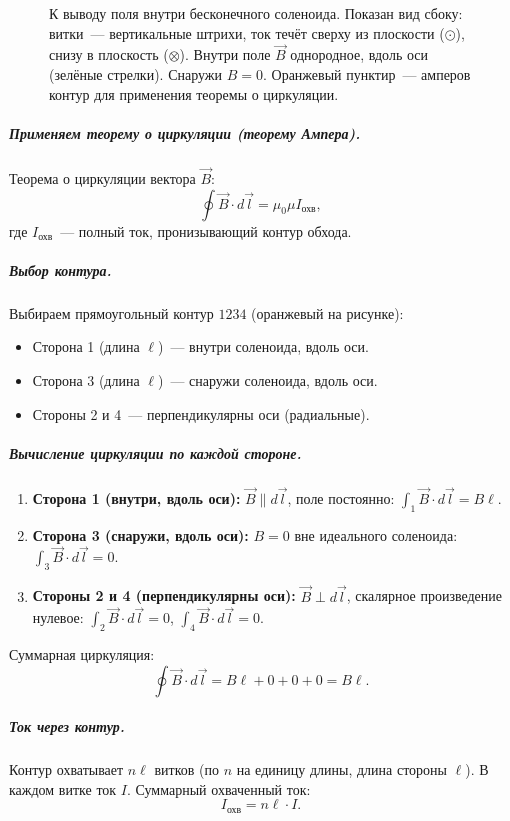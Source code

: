 \documentclass[12pt]{article}
\begin{document}
\begin{figure}[H]
\caption{К выводу поля внутри бесконечного соленоида. Показан вид сбоку:
витки~--- вертикальные штрихи, ток течёт сверху из плоскости
($\odot$), снизу в плоскость ($\otimes$). Внутри поле $\vec{B}$
однородное, вдоль оси (зелёные стрелки). Снаружи $B = 0$. Оранжевый
пунктир~--- амперов контур для применения теоремы о циркуляции.}
\label{fig:solenoid-field}
\end{figure}

\subparagraph{Применяем теорему о циркуляции (теорему Ампера).}
Теорема о циркуляции вектора $\vec{B}$:
\[
    \oint \vec{B}\cdot d\vec{l} = \mu_0\mu I_{\text{охв}},
\]
где $I_{\text{охв}}$~--- полный ток, пронизывающий контур обхода.

\subparagraph{Выбор контура.}
Выбираем прямоугольный контур $1234$ (оранжевый на рисунке):
\begin{itemize}
    \item Сторона 1 (длина $\ell$)~--- внутри соленоида, вдоль оси.
    \item Сторона 3 (длина $\ell$)~--- снаружи соленоида, вдоль оси.
    \item Стороны 2 и 4~--- перпендикулярны оси (радиальные).
\end{itemize}

\subparagraph{Вычисление циркуляции по каждой стороне.}
\begin{enumerate}
    \item \textbf{Сторона 1 (внутри, вдоль оси):}
          $\vec{B} \parallel d\vec{l}$, поле постоянно:
          $\int_1 \vec{B}\cdot d\vec{l} = B\ell$.
    \item \textbf{Сторона 3 (снаружи, вдоль оси):}
          $B = 0$ вне идеального соленоида:
          $\int_3 \vec{B}\cdot d\vec{l} = 0$.
    \item \textbf{Стороны 2 и 4 (перпендикулярны оси):}
          $\vec{B} \perp d\vec{l}$, скалярное произведение нулевое:
          $\int_2 \vec{B}\cdot d\vec{l} = 0$, $\int_4 \vec{B}\cdot d\vec{l} = 0$.
\end{enumerate}
Суммарная циркуляция:
\[
    \oint \vec{B}\cdot d\vec{l} = B\ell + 0 + 0 + 0 = B\ell.
\]

\subparagraph{Ток через контур.}
Контур охватывает $n\ell$ витков (по $n$ на единицу длины, длина стороны
$\ell$). В каждом витке ток $I$. Суммарный охваченный ток:
\[
    I_{\text{охв}} = n\ell \cdot I.
\]
\end{document}
